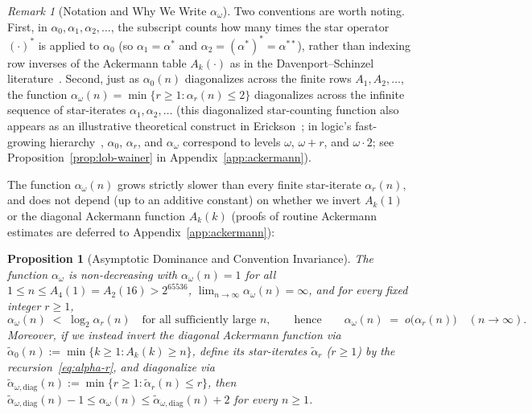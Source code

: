\documentclass[11pt]{article}
\newtheorem{proposition}[theorem]{Proposition}
\theoremstyle{definition}
\theoremstyle{remark}
\newtheorem{remark}[theorem]{Remark}
\begin{document}
\begin{remark}[Notation and Why We Write $\alpha_\omega$]
\label{rem:lob-wainer}
Two conventions are worth noting. First, in $\alpha_0, \alpha_1, \alpha_2, \dots$, the subscript counts how many times the star operator $(\cdot)^*$ is applied to $\alpha_0$ (so $\alpha_1 = \alpha^*$ and $\alpha_2 = (\alpha^*)^* = \alpha^{**}$), rather than indexing row inverses of the Ackermann table $A_k(\cdot)$ as in the Davenport--Schinzel literature~\cite{AgarwalSharirShor1989,Nivasch2010}. Second, just as $\alpha_0(n)$ diagonalizes across the finite rows $A_1, A_2, \dots$, the function $\alpha_\omega(n) = \min\{r \ge 1 : \alpha_r(n) \le 2\}$ diagonalizes across the infinite sequence of star-iterates $\alpha_1, \alpha_2, \dots$ (this diagonalized star-counting function also appears as an illustrative theoretical construct in Erickson~\cite[Section~11.7]{Erickson2013}; in logic's fast-growing hierarchy~\cite{LobWainer1970I,LobWainer1970II}, $\alpha_0$, $\alpha_r$, and $\alpha_\omega$ correspond to levels $\omega$, $\omega + r$, and $\omega \cdot 2$; see Proposition~\ref{prop:lob-wainer} in Appendix~\ref{app:ackermann}).
\end{remark}

The function $\alpha_\omega(n)$ grows strictly slower than every finite star-iterate $\alpha_r(n)$, and does not depend (up to an additive constant) on whether we invert $A_k(1)$ or the diagonal Ackermann function $A_k(k)$ (proofs of routine Ackermann estimates are deferred to Appendix~\ref{app:ackermann}):

\begin{proposition}[Asymptotic Dominance and Convention Invariance]
\label{prop:omega-properties}
The function $\alpha_\omega$ is non-decreasing with $\alpha_\omega(n) = 1$ for all $1 \le n \le A_4(1) = A_2(16) > 2^{65536}$, $\lim_{n \to \infty} \alpha_\omega(n) = \infty$, and for every fixed integer $r \ge 1$,
\[
\alpha_\omega(n) \;<\; \log_2 \alpha_r(n) \quad \text{for all sufficiently large } n,
\qquad\text{hence}\qquad
\alpha_\omega(n) \;=\; o\big(\alpha_r(n)\big) \quad (n \to \infty).
\]
Moreover, if we instead invert the diagonal Ackermann function via $\widetilde{\alpha}_0(n) := \min\{k \ge 1 : A_k(k) \ge n\}$, define its star-iterates $\widetilde{\alpha}_r$ ($r \ge 1$) by the recursion~\eqref{eq:alpha-r}, and diagonalize via $\widetilde{\alpha}_{\omega,\mathrm{diag}}(n) := \min\{r \ge 1 : \widetilde{\alpha}_r(n) \le r\}$, then $\widetilde{\alpha}_{\omega,\mathrm{diag}}(n) - 1 \le \alpha_\omega(n) \le \widetilde{\alpha}_{\omega,\mathrm{diag}}(n) + 2$ for every $n \ge 1$.
\end{proposition}
\end{document}
